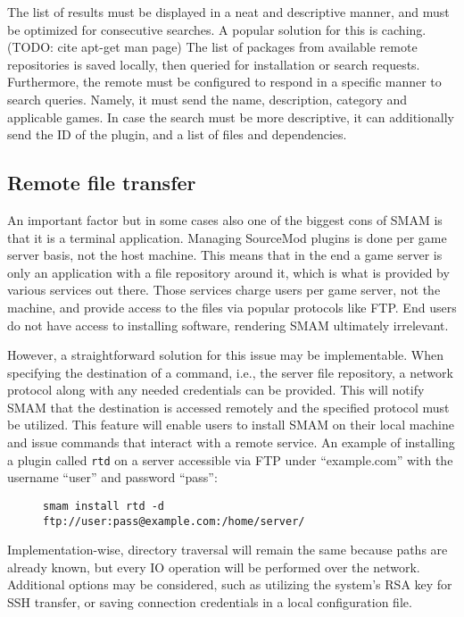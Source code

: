 The list of results must be displayed in a neat and descriptive manner, and must be optimized for consecutive searches.
A popular solution for this is caching. (TODO: cite apt-get man page)
The list of packages from available remote repositories is saved locally, then queried for installation or search requests.
Furthermore, the remote must be configured to respond in a specific manner to search queries.
Namely, it must send the name, description, category and applicable games.
In case the search must be more descriptive, it can additionally send the ID of the plugin, and a list of files and dependencies.

\subsection{Remote file transfer}

An important factor but in some cases also one of the biggest cons of SMAM is that it is a terminal application.
Managing SourceMod plugins is done per game server basis, not the host machine.
This means that in the end a game server is only an application with a file repository around it, which is what is provided by various services out there.
Those services charge users per game server, not the machine, and provide access to the files via popular protocols like FTP\@.
End users do not have access to installing software, rendering SMAM ultimately irrelevant.

However, a straightforward solution for this issue may be implementable.
When specifying the destination of a command, i.e., the server file repository, a network protocol along with any needed credentials can be provided.
This will notify SMAM that the destination is accessed remotely and the specified protocol must be utilized.
This feature will enable users to install SMAM on their local machine and issue commands that interact with a remote service.
An example of installing a plugin called \verb|rtd| on a server accessible via FTP under ``example.com'' with the username ``user'' and password ``pass'':

\begin{figure}[htp]
\centering
\verb|smam install rtd -d ftp://user:pass@example.com:/home/server/|
\end{figure}

Implementation-wise, directory traversal will remain the same because paths are already known, but every IO operation will be performed over the network.
Additional options may be considered, such as utilizing the system's RSA key for SSH transfer, or saving connection credentials in a local configuration file.

